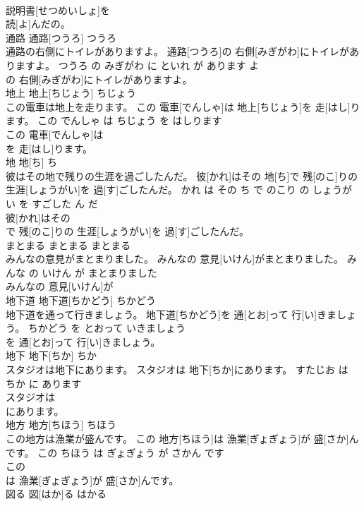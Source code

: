 \documentclass[8pt]{extreport}
\begin{document}
\begin{CJK}{UTF8}{min}
\\	説明書[せつめいしょ]を
\\	読[よ]んだの。			
\\	通路	通路[つうろ]	つうろ	
\\	通路の右側にトイレがありますよ。	通路[つうろ]の 右側[みぎがわ]にトイレがありますよ。	つうろ の みぎがわ に といれ が あります よ	
\\	の 右側[みぎがわ]にトイレがありますよ。			
\\	地上	地上[ちじょう]	ちじょう	
\\	この電車は地上を走ります。	この 電車[でんしゃ]は 地上[ちじょう]を 走[はし]ります。	この でんしゃ は ちじょう を はしります	
\\	この 電車[でんしゃ]は
\\	を 走[はし]ります。			
\\	地	地[ち]	ち	
\\	彼はその地で残りの生涯を過ごしたんだ。	彼[かれ]はその 地[ち]で 残[のこ]りの 生涯[しょうがい]を 過[す]ごしたんだ。	かれ は その ち で のこり の しょうがい を すごした ん だ	
\\	彼[かれ]はその
\\	で 残[のこ]りの 生涯[しょうがい]を 過[す]ごしたんだ。			
\\	まとまる	まとまる	まとまる	
\\	みんなの意見がまとまりました。	みんなの 意見[いけん]がまとまりました。	みんな の いけん が まとまりました	
\\	みんなの 意見[いけん]が
\\	地下道	地下道[ちかどう]	ちかどう	
\\	地下道を通って行きましょう。	地下道[ちかどう]を 通[とお]って 行[い]きましょう。	ちかどう を とおって いきましょう	
\\	を 通[とお]って 行[い]きましょう。			
\\	地下	地下[ちか]	ちか	
\\	スタジオは地下にあります。	スタジオは 地下[ちか]にあります。	すたじお は ちか に あります	
\\	スタジオは
\\	にあります。			
\\	地方	地方[ちほう]	ちほう	
\\	この地方は漁業が盛んです。	この 地方[ちほう]は 漁業[ぎょぎょう]が 盛[さか]んです。	この ちほう は ぎょぎょう が さかん です	
\\	この
\\	は 漁業[ぎょぎょう]が 盛[さか]んです。			
\\	図る	図[はか]る	はかる	

\end{CJK}
\end{document}
